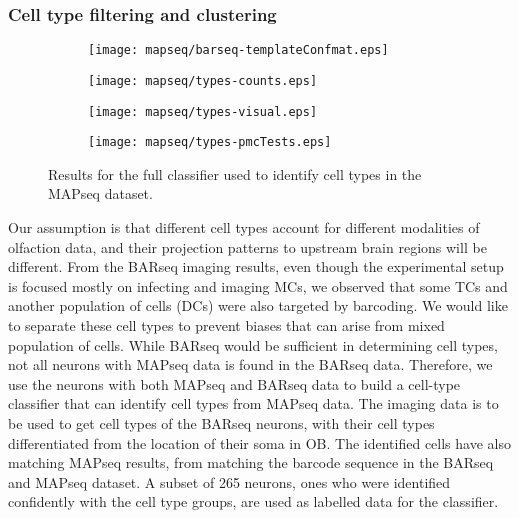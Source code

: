 \documentclass[../dissertation.tex]{subfiles}
\begin{document}
\subsubsection{Cell type filtering and clustering}

\begin{figure}[p]
    \centering
    \begin{subfigure}[b]{0.3\textwidth}
        \texttt{[image: mapseq/barseq-templateConfmat.eps]}
        \label{fig:celltype-confusion}
    \end{subfigure}
    \hfill
    \begin{subfigure}[b]{0.6\textwidth}
        \texttt{[image: mapseq/types-counts.eps]}
        \label{fig:celltype-sets}
    \end{subfigure}
    
    \begin{subfigure}[b]{0.7\textwidth}
        \texttt{[image: mapseq/types-visual.eps]}
        \label{fig:celltype-pattern}
    \end{subfigure}
    
    \begin{subfigure}[b]{0.7\textwidth}
        \texttt{[image: mapseq/types-pmcTests.eps]}
        \label{fig:celltype-ttcm}
    \end{subfigure}

    \caption{Results for the full classifier used to identify cell types in the MAPseq dataset.}
    \label{fig:celltype}
\end{figure}

Our assumption is that different cell types account for different modalities of olfaction data, and their projection patterns to upstream brain regions will be different.
From the BARseq imaging results, even though the experimental setup is focused mostly on infecting and imaging MCs, we observed that some TCs and another population of cells (DCs) were also targeted by barcoding.
We would like to separate these cell types to prevent biases that can arise from mixed population of cells.
While BARseq would be sufficient in determining cell types, not all neurons with MAPseq data is found in the BARseq data.
Therefore, we use the neurons with both MAPseq and BARseq data to build a cell-type classifier that can identify cell types from MAPseq data.
The imaging data is to be used to get cell types of the BARseq neurons, with their cell types differentiated from the location of their soma in OB.
The identified cells have also matching MAPseq results, from matching the barcode sequence in the BARseq and MAPseq dataset.
A subset of 265 neurons, ones who were identified confidently with the cell type groups, are used as labelled data for the classifier.
\end{document}
